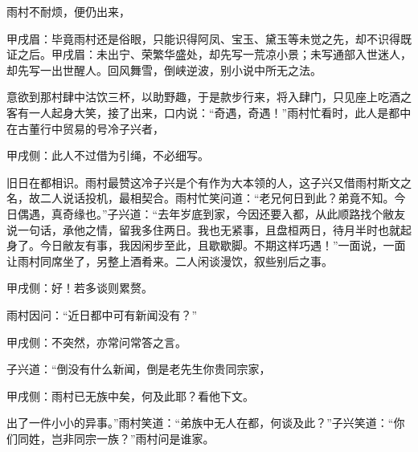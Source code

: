 \begin{parag}
    雨村不耐烦，便仍出来，\begin{note}甲戌眉：毕竟雨村还是俗眼，只能识得阿凤、宝玉、黛玉等未觉之先，却不识得既证之后。甲戌眉：未出宁、荣繁华盛处，却先写一荒凉小景；未写通部入世迷人，却先写一出世醒人。回风舞雪，倒峡逆波，别小说中所无之法。\end{note}意欲到那村肆中沽饮三杯，以助野趣，于是款步行来，将入肆门，只见座上吃酒之客有一人起身大笑，接了出来，口内说：“奇遇，奇遇！”雨村忙看时，此人是都中在古董行中贸易的号冷子兴者，\begin{note}甲戌侧：此人不过借为引绳，不必细写。\end{note}旧日在都相识。雨村最赞这冷子兴是个有作为大本领的人，这子兴又借雨村斯文之名，故二人说话投机，最相契合。雨村忙笑问道：“老兄何日到此？弟竟不知。今日偶遇，真奇缘也。”子兴道：“去年岁底到家，今因还要入都，从此顺路找个敝友说一句话，承他之情，留我多住两日。我也无紧事，且盘桓两日，待月半时也就起身了。今日敝友有事，我因闲步至此，且歇歇脚。不期这样巧遇！”一面说，一面让雨村同席坐了，另整上酒肴来。二人闲谈漫饮，叙些别后之事。\begin{note}甲戌侧：好！若多谈则累赘。\end{note}
\end{parag}


\begin{parag}
    雨村因问：“近日都中可有新闻没有？”\begin{note}甲戌侧：不突然，亦常问常答之言。\end{note}子兴道：“倒没有什么新闻，倒是老先生你贵同宗家，\begin{note}甲戌侧：雨村已无族中矣，何及此耶？看他下文。\end{note}出了一件小小的异事。”雨村笑道：“弟族中无人在都，何谈及此？”子兴笑道：“你们同姓，岂非同宗一族？”雨村问是谁家。
\end{parag}


